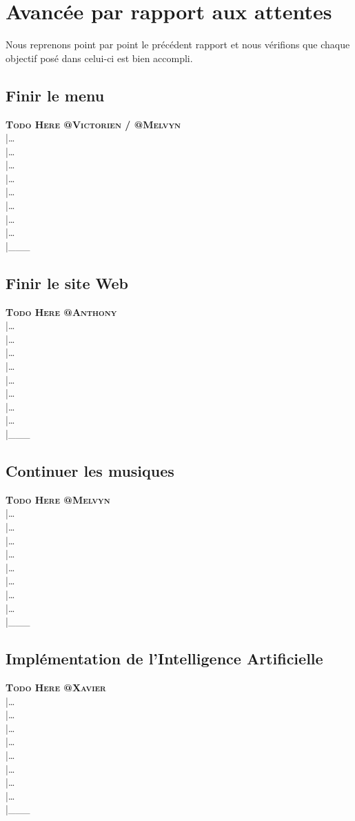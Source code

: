 \documentclass[12pt,a4paper]{article}
\newcommand{\AI}{Intelligence Artificielle}
\begin{document}
    \section{Avancée par rapport aux attentes}
        Nous reprenons point par point le précédent rapport et nous vérifions que chaque objectif
        posé dans celui-ci est bien accompli.
        \subsection{Finir le menu}
            \textbf{\textsc{Todo Here @Victorien / @Melvyn}}\\
            |\dots\\|\dots\\|\dots\\|\dots\\|\dots\\|\dots\\|\dots\\|\dots\\|\_\_\_\\
        \subsection{Finir le site Web}
            \textbf{\textsc{Todo Here @Anthony}}\\
            |\dots\\|\dots\\|\dots\\|\dots\\|\dots\\|\dots\\|\dots\\|\dots\\|\_\_\_\\
        \subsection{Continuer les musiques}
            \textbf{\textsc{Todo Here @Melvyn}}\\
            |\dots\\|\dots\\|\dots\\|\dots\\|\dots\\|\dots\\|\dots\\|\dots\\|\_\_\_\\
        \subsection{Implémentation de l'\AI}
            \textbf{\textsc{Todo Here @Xavier}}\\
            |\dots\\|\dots\\|\dots\\|\dots\\|\dots\\|\dots\\|\dots\\|\dots\\|\_\_\_\\
\end{document}
